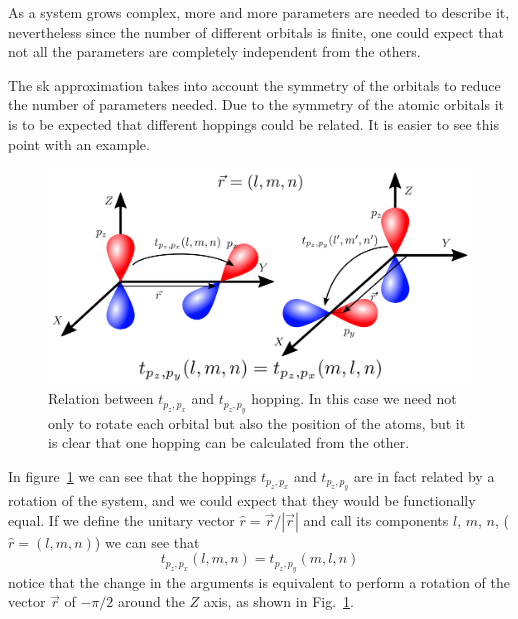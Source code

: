 As a system grows complex, more and more parameters are needed to describe it, nevertheless since the number of different orbitals is finite, one could expect that not all the parameters are completely independent from the others.


The \ac{sk} approximation takes into account the symmetry of the orbitals to reduce the number of parameters needed. Due to the symmetry of the atomic orbitals it is to be expected that different hoppings could be related. It is easier to see this point with an example.
\begin{figure}[h!]
\centering
\includegraphics{chapter04/figures/complex.png}
\vspace{-5pt}
\caption{Relation between $t_{p_{z},p_{x}}$ and $t_{p_{z},p_{y}}$ hopping. In this case we need not only to rotate each orbital but also the position of the atoms, but it is clear that one hopping can be calculated from the other.}
\label{complex}
\end{figure}
\FloatBarrier
In figure~\ref{complex} we can see that the hoppings $t_{p_{z},p_{x}}$ and $t_{p_{z},p_{y}}$ are in fact related by a rotation of the system, and we could expect that they would be functionally equal.
If we define the unitary vector $\hat{r} = \vec{r}/|\vec{r}|$ and call its components $l$, $m$, $n$, ($\hat{r}=(l,m,n)$) we can see that
\begin{equation}
  t_{p_{z},p_{x}} (l,m,n) = t_{p_{z},p_{y}}(m,l,n)
\end{equation}
notice that the change in the arguments is equivalent to perform a rotation of the vector $\vec{r}$ of $-\pi/2$ around the $Z$ axis, as shown in Fig.~\ref{complex}.

